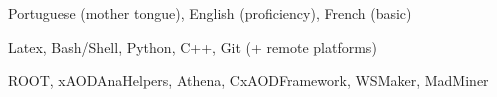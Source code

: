 
\begin{cvskills}

{Portuguese (mother tongue), English (proficiency), French (basic)}

{Latex, Bash/Shell, Python, C++, Git (+ remote platforms)}

{ROOT, xAODAnaHelpers, Athena, CxAODFramework, WSMaker, MadMiner}

\end{cvskills}